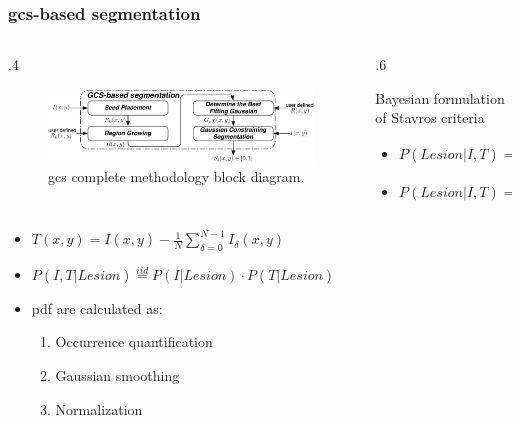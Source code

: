 \begin{frame}\frametitle{\acs{gcs}-based segmentation}\tiny
\begin{columns}
\begin{column}{.4\textwidth}
\begin{figure}[Htb]%
\centering
\includegraphics[trim=2 0 2 2, clip,width=\textwidth]{IWDMmethodDiagram}
\caption{{\tiny \ac{gcs} complete methodology block diagram.}}
\label{fig:methodDiagram}
\end{figure}
\end{column}
\begin{column}{.6\textwidth}
\begin{block}{{\small Bayesian formulation of Stavros criteria\footnotemark[1]}}
{\tiny
\begin{itemize}
\item $P(Lesion|I,T)  = \frac{P(I,T|Lesion) \cdot P(Lesion)}{P(I,T)} $
\item $P(Lesion|I,T)  = P(I| Lesion ) \cdot P(T| Lesion) \cdot P( Lesion| x,y)$
\end{itemize}
}
\end{block}
\end{column}
\end{columns}
\centering
\begin{itemize}\footnotesize
\item $T(x,y) = I(x,y) - \frac{1}{N} \sum\nolimits_{\delta=0}^{N-1}I_\delta(x,y) $
\item $P(I,T|Lesion)\stackrel{iid}{=}P(I|Lesion) \cdot P(T|Lesion) $
\item {\footnotesize \ac{pdf} are calculated as: }
\begin{enumerate}\scriptsize
\item Occurrence quantification
\item Gaussian smoothing
\item Normalization
\end{enumerate}
\end{itemize}
\end{frame}




